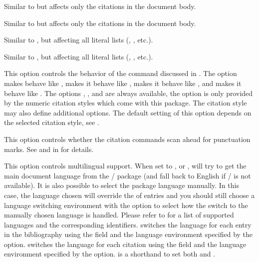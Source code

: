 \documentclass{ltxdockit}[2011/03/25]
\newcommand*{\biblatex}{\sty{biblatex}\xspace}
\begin{document}
\begin{optionlist}

Similar to  but affects only the citations in the document body.


Similar to  but affects only the citations in the document body.


Similar to , but affecting all literal lists (, , etc.).


Similar to , but affecting all literal lists (, , etc.).


This option controls the behavior of the  command discussed in . The  option makes  behave like ,  makes it behave like ,  makes it behave like , and  makes it behave like . The options , , and  are always available, the  option is only provided by the numeric citation styles which come with this package. The citation style may also define additional options. The default setting of this option depends on the selected citation style, see .


This option controls whether the citation commands scan ahead for punctuation marks. See  and  in  for details.


This option controls multilingual support. When set to ,  or , \biblatex will try to get the main document language from the / package (and fall back to English if / is not available). It is also possible to select the package language manually. In this case, the language chosen will override the  of entries and you should still choose a language switching environment with the  option to select how the switch to the manually chosen language is handled. Please refer to  for a list of supported languages and the corresponding identifiers.  switches the language for each entry in the bibliography using the  field and the language environment specified by the  option.  switches the language for each citation using the  field and the language environment specified by the  option.  is a shorthand to set both  and .


\end{optionlist}
\end{document}
